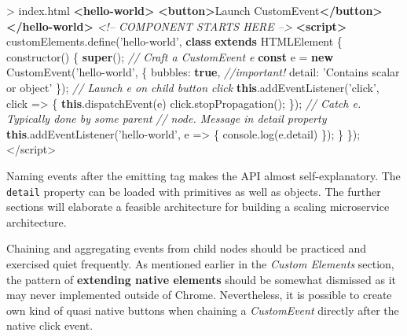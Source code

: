 \documentclass[]{article}
\newenvironment{Shaded}{}{}
\newcommand{\KeywordTok}[1]{\textcolor[rgb]{0.00,0.44,0.13}{\textbf{{#1}}}}
\newcommand{\DataTypeTok}[1]{\textcolor[rgb]{0.56,0.13,0.00}{{#1}}}
\newcommand{\StringTok}[1]{\textcolor[rgb]{0.25,0.44,0.63}{{#1}}}
\newcommand{\SpecialStringTok}[1]{\textcolor[rgb]{0.73,0.40,0.53}{{#1}}}
\newcommand{\CommentTok}[1]{\textcolor[rgb]{0.38,0.63,0.69}{\textit{{#1}}}}
\newcommand{\VariableTok}[1]{\textcolor[rgb]{0.10,0.09,0.49}{{#1}}}
\newcommand{\OperatorTok}[1]{\textcolor[rgb]{0.40,0.40,0.40}{{#1}}}
\newcommand{\AttributeTok}[1]{\textcolor[rgb]{0.49,0.56,0.16}{{#1}}}
\newcommand{\NormalTok}[1]{{#1}}
\begin{document}
\begin{Shaded}
\begin{Highlighting}[]
\NormalTok{> index.html}
\KeywordTok{<hello-world>}
 \KeywordTok{<button>}\NormalTok{Launch CustomEvent}\KeywordTok{</button>}
\KeywordTok{</hello-world>}
\CommentTok{<!-- COMPONENT STARTS HERE -->}
\KeywordTok{<script>}
 \VariableTok{customElements}\NormalTok{.}\AttributeTok{define}\NormalTok{(}\StringTok{'hello-world'}\OperatorTok{,} 
 \KeywordTok{class} \KeywordTok{extends} \NormalTok{HTMLElement }\OperatorTok{\{}
  \AttributeTok{constructor}\NormalTok{() }\OperatorTok{\{}
    \KeywordTok{super}\NormalTok{()}\OperatorTok{;}
   \CommentTok{// Craft a CustomEvent e}
    \KeywordTok{const} \NormalTok{e }\OperatorTok{=} \KeywordTok{new} \AttributeTok{CustomEvent}\NormalTok{(}\StringTok{'hello-world'}\OperatorTok{,} \OperatorTok{\{}
    \DataTypeTok{bubbles}\OperatorTok{:} \KeywordTok{true}\OperatorTok{,} \CommentTok{//important!}
    \DataTypeTok{detail}\OperatorTok{:} \StringTok{'Contains scalar or object'}
   \OperatorTok{\}}\NormalTok{)}\OperatorTok{;}
   \CommentTok{// Launch e on child button click}
   \KeywordTok{this}\NormalTok{.}\AttributeTok{addEventListener}\NormalTok{(}\StringTok{'click'}\OperatorTok{,} \NormalTok{click }\OperatorTok{=>} \OperatorTok{\{}
    \KeywordTok{this}\NormalTok{.}\AttributeTok{dispatchEvent}\NormalTok{(e)}
    \VariableTok{click}\NormalTok{.}\AttributeTok{stopPropagation}\NormalTok{()}\OperatorTok{;}
   \OperatorTok{\}}\NormalTok{)}\OperatorTok{;}
   \CommentTok{// Catch e. Typically done by some parent}
     \CommentTok{// node. Message in detail property}
   \KeywordTok{this}\NormalTok{.}\AttributeTok{addEventListener}\NormalTok{(}\StringTok{'hello-world'}\OperatorTok{,} \NormalTok{e }\OperatorTok{=>} \OperatorTok{\{}
    \VariableTok{console}\NormalTok{.}\AttributeTok{log}\NormalTok{(}\VariableTok{e}\NormalTok{.}\AttributeTok{detail}\NormalTok{)}
   \OperatorTok{\}}\NormalTok{)}\OperatorTok{;}
  \OperatorTok{\}}
 \OperatorTok{\}}\NormalTok{)}\OperatorTok{;}
\OperatorTok{<}\SpecialStringTok{/script>}
\end{Highlighting}
\end{Shaded}

Naming events after the emitting tag makes the API almost
self-explanatory. The \texttt{detail} property can be loaded with
primitives as well as objects. The further sections will elaborate a
feasible architecture for building a scaling microservice architecture.

Chaining and aggregating events from child nodes should be practiced and
exercised quiet frequently. As mentioned earlier in the \emph{Custom
Elements} section, the pattern of \textbf{extending native elements}
should be somewhat dismissed as it may never implemented outside of
Chrome. Nevertheless, it is possible to create own kind of quasi native
buttons when chaining a \emph{CustomEvent} directly after the native
click event.
\end{document}
